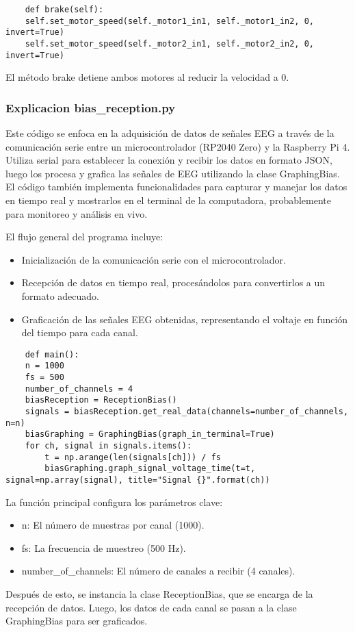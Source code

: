 \documentclass{article}
\begin{document}
\begin{lstlisting}
    def brake(self):
    self.set_motor_speed(self._motor1_in1, self._motor1_in2, 0, invert=True)
    self.set_motor_speed(self._motor2_in1, self._motor2_in2, 0, invert=True)
\end{lstlisting}
El método brake detiene ambos motores al reducir la velocidad a 0.

\subsubsection{Explicacion bias\_reception.py}
Este código se enfoca en la adquisición de datos de señales EEG a través de la comunicación serie entre un microcontrolador (RP2040 Zero) y la Raspberry Pi 4. Utiliza serial para establecer la conexión y recibir los datos en formato JSON, luego los procesa y grafica las señales de EEG utilizando la clase GraphingBias. El código también implementa funcionalidades para capturar y manejar los datos en tiempo real y mostrarlos en el terminal de la computadora, probablemente para monitoreo y análisis en vivo.

El flujo general del programa incluye:

\begin{itemize}
    \item Inicialización de la comunicación serie con el microcontrolador.
    \item Recepción de datos en tiempo real, procesándolos para convertirlos a un formato adecuado.
    \item Graficación de las señales EEG obtenidas, representando el voltaje en función del tiempo para cada canal.
\end{itemize}

\begin{lstlisting}
    def main():
    n = 1000
    fs = 500
    number_of_channels = 4
    biasReception = ReceptionBias()
    signals = biasReception.get_real_data(channels=number_of_channels, n=n)
    biasGraphing = GraphingBias(graph_in_terminal=True)
    for ch, signal in signals.items():
        t = np.arange(len(signals[ch])) / fs
        biasGraphing.graph_signal_voltage_time(t=t, signal=np.array(signal), title="Signal {}".format(ch))
\end{lstlisting}
La función principal configura los parámetros clave:

\begin{itemize}
    \item n: El número de muestras por canal (1000).
    \item fs: La frecuencia de muestreo (500 Hz).
    \item number\_of\_channels: El número de canales a recibir (4 canales).
\end{itemize}
Después de esto, se instancia la clase ReceptionBias, que se encarga de la recepción de datos. Luego, los datos de cada canal se pasan a la clase GraphingBias para ser graficados.
\end{document}
